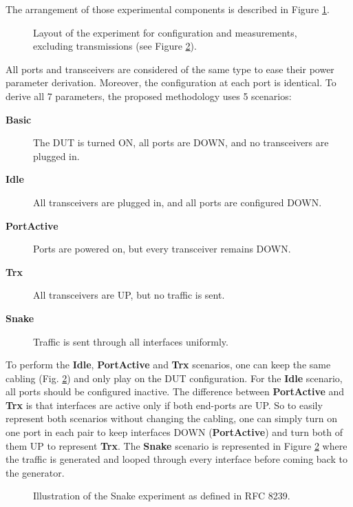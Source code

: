 The arrangement of those experimental components is described in Figure \ref{fig:setup}.
\begin{figure}[t]
	\begin{center}
		
	\end{center}
	\caption{Layout of the experiment for configuration and measurements, excluding transmissions (see Figure \ref{fig:snake}).}\label{fig:setup}
\end{figure}


All ports and transceivers are considered of the same type to ease their power parameter derivation.
Moreover, the configuration at each port is identical.
To derive all 7 parameters, the proposed methodology uses 5 scenarios:
\begin{description}
	\item [\textbf{Basic}] The DUT is turned ON, all ports are DOWN, and no transceivers are plugged in.  
	\item [\textbf{Idle}] All transceivers are plugged in, and all ports are configured DOWN.
	\item [\textbf{PortActive}] \hspace{15pt} Ports are powered on, but every transceiver remains DOWN. 
	\item [\textbf{Trx}] All transceivers are UP, but no traffic is sent. 
	\item [\textbf{Snake}] Traffic is sent through all interfaces uniformly.
\end{description}

To perform the \textbf{Idle}, \textbf{PortActive} and \textbf{Trx} scenarios, one can keep the same cabling (Fig. \ref{fig:snake}) and only play on the DUT configuration.
For the \textbf{Idle} scenario, all ports should be configured inactive.
The difference between \textbf{PortActive} and \textbf{Trx} is that interfaces are active only if both end-ports are UP.
So to easily represent both scenarios without changing the cabling, one can simply turn on one port in each pair to keep interfaces DOWN (\textbf{PortActive}) and turn both of them UP to represent \textbf{Trx}. 
The \textbf{Snake} scenario is represented in Figure \ref{fig:snake} where the traffic is generated and looped through every interface before coming back to the generator.   

\begin{figure}
	\begin{center}
		
	\end{center}
	\caption{Illustration of the Snake experiment as defined in RFC 8239\cite{rfc8239snake}.}\label{fig:snake}
\end{figure}


